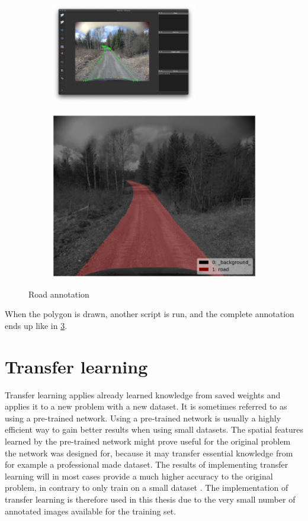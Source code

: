 \documentclass[USenglish]{ifimaster}  %
\begin{document}
\begin{figure}[ht]
\centering
\begin{subfigure}{.6\textwidth}
\includegraphics[width=0.7\textwidth]{bilder/annotating.png}
\label{fig:annotate}
\end{subfigure}
\begin{subfigure}{.6\textwidth}
\includegraphics[width=.7\linewidth]{bilder/label_viz.png}
\label{fig:finished_annotation}
\end{subfigure}
\caption{Road annotation}
\end{figure}

When the polygon is drawn, another script is run, and the complete annotation ends up like in \cref{fig:finished_annotation}.  


\section{Transfer learning}
Transfer learning applies already learned knowledge from saved weights and applies it to a new problem with a new dataset. It is sometimes referred to as using a pre-trained network. Using a pre-trained network is usually a highly efficient way to gain better results when using small datasets. The spatial features learned by the pre-trained network might prove useful for the original problem the network was designed for, because it may transfer essential knowledge from for example a professional made dataset. The results of implementing transfer learning will in most cases provide a much higher accuracy to the original problem, in contrary to only train on a small dataset \cite{Francois_Deep_learning_with_python}. The implementation of transfer learning is therefore used in this thesis due to the very small number of annotated images available for the training set. 
\end{document}
